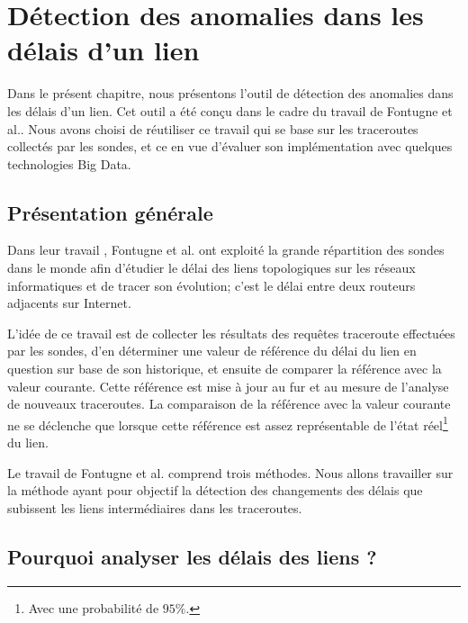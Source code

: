 \chapter{Détection des anomalies dans les délais d'un lien}
Dans le présent chapitre, nous présentons l'outil de détection des anomalies dans les délais d'un lien. Cet outil a été  conçu dans le cadre du travail \cite{DBLP:journals/corr/FontugneAPB16}  de  Fontugne et al.. Nous avons choisi de réutiliser ce travail qui se base sur les traceroutes collectés par les sondes, et ce en vue d'évaluer son implémentation avec quelques technologies  Big Data.  

\section{Présentation générale}

Dans leur travail \cite{DBLP:journals/corr/FontugneAPB16}, Fontugne et al. ont exploité la grande répartition  des sondes  dans le monde afin d'étudier le délai des liens topologiques sur les réseaux informatiques et de tracer son évolution; c'est le délai entre deux routeurs adjacents sur Internet.

L'idée de ce travail est de collecter les résultats des requêtes traceroute effectuées par les sondes, d'en déterminer une valeur de référence du délai du lien en question sur base de  son historique, et ensuite de comparer la référence avec la valeur courante.  Cette référence est mise à jour au fur et au mesure de l'analyse de nouveaux traceroutes. 
La comparaison de la référence avec la valeur courante ne se déclenche que lorsque cette  référence est assez représentable de l'état réel\footnote{Avec une probabilité de $95\%$.} du lien.

Le travail \cite{DBLP:journals/corr/FontugneAPB16} de  Fontugne et al.  comprend trois méthodes. Nous allons travailler sur la méthode ayant pour objectif la détection des changements des délais que subissent les liens intermédiaires dans les traceroutes.

\section{Pourquoi analyser les délais des liens  ?}


